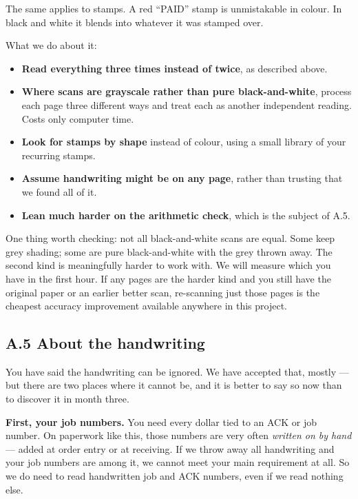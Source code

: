 \documentclass[
]{article}
\providecommand{\tightlist}{%
  \setlength{\itemsep}{0pt}\setlength{\parskip}{0pt}}
\begin{document}
The same applies to stamps. A red ``PAID'' stamp is unmistakable in
colour. In black and white it blends into whatever it was stamped over.

What we do about it:

\begin{itemize}
\tightlist
\item
  \textbf{Read everything three times instead of twice}, as described
  above.
\item
  \textbf{Where scans are grayscale rather than pure black-and-white},
  process each page three different ways and treat each as another
  independent reading. Costs only computer time.
\item
  \textbf{Look for stamps by shape} instead of colour, using a small
  library of your recurring stamps.
\item
  \textbf{Assume handwriting might be on any page}, rather than trusting
  that we found all of it.
\item
  \textbf{Lean much harder on the arithmetic check}, which is the
  subject of A.5.
\end{itemize}

One thing worth checking: not all black-and-white scans are equal. Some
keep grey shading; some are pure black-and-white with the grey thrown
away. The second kind is meaningfully harder to work with. We will
measure which you have in the first hour. If any pages are the harder
kind and you still have the original paper or an earlier better scan,
re-scanning just those pages is the cheapest accuracy improvement
available anywhere in this project.

\subsection{A.5 About the handwriting}\label{a.5-about-the-handwriting}

You have said the handwriting can be ignored. We have accepted that,
mostly --- but there are two places where it cannot be, and it is better
to say so now than to discover it in month three.

\textbf{First, your job numbers.} You need every dollar tied to an ACK
or job number. On paperwork like this, those numbers are very often
\emph{written on by hand} --- added at order entry or at receiving. If
we throw away all handwriting and your job numbers are among it, we
cannot meet your main requirement at all. So we do need to read
handwritten job and ACK numbers, even if we read nothing else.
\end{document}
